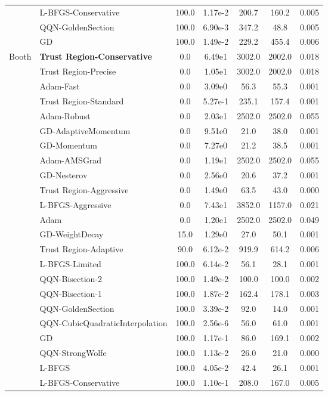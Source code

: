 \documentclass{article}
\begin{document}
\begin{table}[htbp]
{\begin{tabular}{p{2.5cm}p{2.5cm}*{5}{c}}
 & L-BFGS-Conservative & 100.0 & 1.17e-2 & 200.7 & 160.2 & 0.005 \\
 & QQN-GoldenSection & 100.0 & 6.90e-3 & 347.2 & 48.8 & 0.005 \\
 & GD & 100.0 & 1.49e-2 & 229.2 & 455.4 & 0.006 \\
\midrule
\multirow{25}{*}{Booth} & \textbf{Trust Region-Conservative} & 0.0 & 6.49e1 & 3002.0 & 2002.0 & 0.018 \\
 & Trust Region-Precise & 0.0 & 1.05e1 & 3002.0 & 2002.0 & 0.018 \\
 & Adam-Fast & 0.0 & 3.09e0 & 56.3 & 55.3 & 0.001 \\
 & Trust Region-Standard & 0.0 & 5.27e-1 & 235.1 & 157.4 & 0.001 \\
 & Adam-Robust & 0.0 & 2.03e1 & 2502.0 & 2502.0 & 0.055 \\
 & GD-AdaptiveMomentum & 0.0 & 9.51e0 & 21.0 & 38.0 & 0.001 \\
 & GD-Momentum & 0.0 & 7.27e0 & 21.2 & 38.5 & 0.001 \\
 & Adam-AMSGrad & 0.0 & 1.19e1 & 2502.0 & 2502.0 & 0.055 \\
 & GD-Nesterov & 0.0 & 2.56e0 & 20.6 & 37.2 & 0.001 \\
 & Trust Region-Aggressive & 0.0 & 1.49e0 & 63.5 & 43.0 & 0.000 \\
 & L-BFGS-Aggressive & 0.0 & 7.43e1 & 3852.0 & 1157.0 & 0.021 \\
 & Adam & 0.0 & 1.20e1 & 2502.0 & 2502.0 & 0.049 \\
 & GD-WeightDecay & 15.0 & 1.29e0 & 27.0 & 50.1 & 0.001 \\
 & Trust Region-Adaptive & 90.0 & 6.12e-2 & 919.9 & 614.2 & 0.006 \\
 & L-BFGS-Limited & 100.0 & 6.14e-2 & 56.1 & 28.1 & 0.001 \\
 & QQN-Bisection-2 & 100.0 & 1.49e-2 & 100.0 & 100.0 & 0.002 \\
 & QQN-Bisection-1 & 100.0 & 1.87e-2 & 162.4 & 178.1 & 0.003 \\
 & QQN-GoldenSection & 100.0 & 3.39e-2 & 92.0 & 14.0 & 0.001 \\
 & QQN-CubicQuadraticInterpolation & 100.0 & 2.56e-6 & 56.0 & 61.0 & 0.001 \\
 & GD & 100.0 & 1.17e-1 & 86.0 & 169.1 & 0.002 \\
 & QQN-StrongWolfe & 100.0 & 1.13e-2 & 26.0 & 21.0 & 0.000 \\
 & L-BFGS & 100.0 & 4.05e-2 & 42.4 & 26.1 & 0.001 \\
 & L-BFGS-Conservative & 100.0 & 1.10e-1 & 208.0 & 167.0 & 0.005 \\

\end{tabular}}
\end{table}
\end{document}
